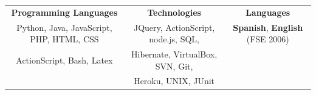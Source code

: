 \documentclass[10pt]{article}
\newcommand\VRule{\color{lightgray}\vrule width 0.5pt}
\begin{document}
%
%
%
%
%


\vspace{1em}
\begin{tabular}{ccc}
\textbf{Programming Languages} & \textbf{Technologies} & \textbf{Languages}\\
Python, Java, JavaScript, PHP, HTML, CSS
 & JQuery, ActionScript, node.js, SQL, 
 & {\bf Spanish}, {\bf English} (FSE 2006) \\
  ActionScript, Bash, Latex &  Hibernate, VirtualBox, SVN, Git, & \\
 &  Heroku, UNIX, JUnit & \\
\end{tabular}
\end{document}
